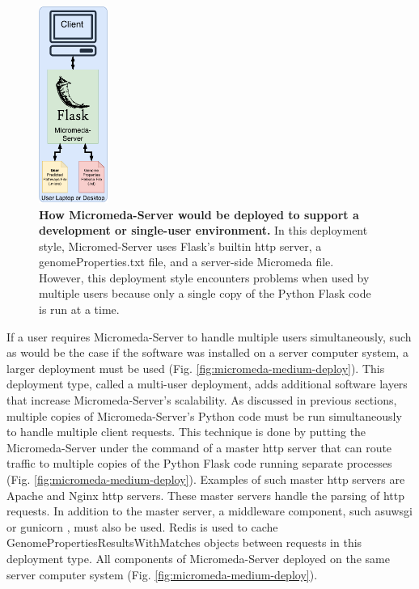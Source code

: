 \begin{figure}[!ht]
  \centering
	\includegraphics[width=0.20\textwidth]{media/micromeda-simple-deployment.pdf}
	 \caption[How Micromeda-Server would be deployed to support a development or 
single-user environment.]{\textbf{How Micromeda-Server would be deployed to 
support a development or single-user environment.} In this deployment style, 
Micromed-Server uses Flask's builtin \gls{http} server, a genomeProperties.txt 
file, and a server-side Micromeda file. However, this deployment style 
encounters problems when used by multiple users because only a single copy of 
the Python Flask code is run at a time.}
	 \label{fig:micromeda-small-deploy}
\end{figure}

If a user requires Micromeda-Server to handle multiple users simultaneously, 
such as would be the case if the software was installed on a server computer 
system, a larger deployment must be used (Fig. 
\ref{fig:micromeda-medium-deploy}). This deployment type, called a multi-user 
deployment, adds additional software layers that increase Micromeda-Server's 
scalability. As discussed in previous sections, multiple copies of 
Micromeda-Server's Python code must be run simultaneously to handle multiple 
client requests. This technique is done by putting the Micromeda-Server under 
the command of a master \gls{http} server that can route traffic to multiple 
copies of the Python Flask code running separate processes (Fig. 
\ref{fig:micromeda-medium-deploy}). Examples of such master \gls{http} servers 
are Apache \cite{fielding1997apache} and Nginx \cite{reese2008nginx} \gls{http} 
servers. These master servers handle the parsing of \gls{http} requests. In 
addition to the master server, a middleware component, such as\gls{uwsgi} 
\cite{2019uwsgi} or gunicorn \cite{chesneau_2018}, must also be used. Redis is 
used to cache GenomePropertiesResultsWithMatches objects between requests in 
this deployment type. All components of Micromeda-Server deployed on the same 
server computer system (Fig. \ref{fig:micromeda-medium-deploy}).

